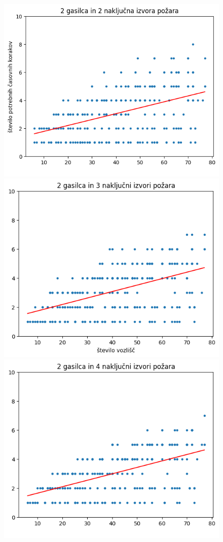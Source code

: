 \documentclass[a4paper, 12pt]{article}
\begin{document}
\begin{figure}[!htb]
      \includegraphics[width=\linewidth]{plot22}
    \endminipage\hfill
      \includegraphics[width=\linewidth]{plot23}
    \endminipage\hfill
      \includegraphics[width=\linewidth]{plot24}

\end{figure}
\end{document}
